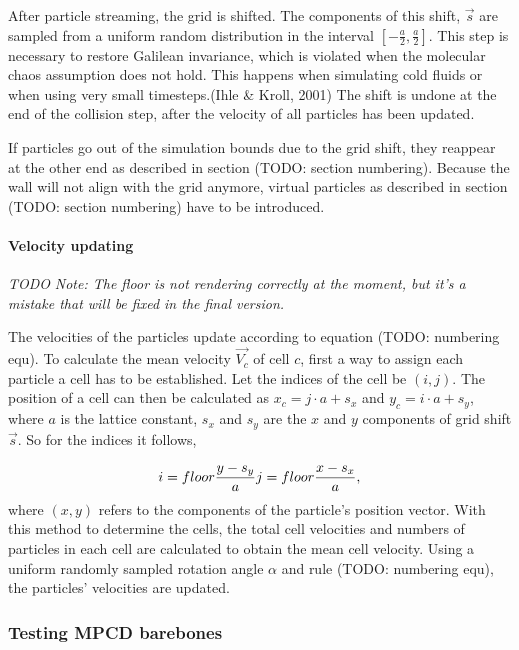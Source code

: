 \documentclass[
]{article}
\begin{document}
After particle streaming, the grid is shifted. The components of this
shift, \(\vec{s}\) are sampled from a uniform random distribution in the
interval \([-\frac{a}{2},\frac{a}{2}]\). This step is necessary to
restore Galilean invariance, which is violated when the molecular chaos
assumption does not hold. This happens when simulating cold fluids or
when using very small timesteps.(Ihle \& Kroll, 2001) The shift is
undone at the end of the collision step, after the velocity of all
particles has been updated.

If particles go out of the simulation bounds due to the grid shift, they
reappear at the other end as described in section (TODO: section
numbering). Because the wall will not align with the grid anymore,
virtual particles as described in section (TODO: section numbering) have
to be introduced.

\hypertarget{velocity-updating}{%
\paragraph{Velocity updating}\label{velocity-updating}}

\emph{TODO} \emph{Note: The floor is not rendering correctly at the
moment, but it's a mistake that will be fixed in the final version.}

The velocities of the particles update according to equation (TODO:
numbering equ). To calculate the mean velocity \(\vec{V_{c}}\) of cell
\(c\), first a way to assign each particle a cell has to be established.
Let the indices of the cell be \((i, j)\). The position of a cell can
then be calculated as \(x_c = j \cdot a + s_x\) and
\(y_c = i \cdot a + s_y\), where \(a\) is the lattice constant, \(s_x\)
and \(s_y\) are the \(x\) and \(y\) components of grid shift
\(\vec{s}\). So for the indices it follows,

\begin{equation}
i = floor{\frac{y - s_y}{a}}\\
j = floor{\frac{x - s_x}{a}},
\end{equation} where \((x,y)\) refers to the components of the
particle's position vector. With this method to determine the cells, the
total cell velocities and numbers of particles in each cell are
calculated to obtain the mean cell velocity. Using a uniform randomly
sampled rotation angle \(\alpha\) and rule (TODO: numbering equ), the
particles' velocities are updated.

\hypertarget{testing-mpcd-barebones}{%
\subsubsection{Testing MPCD barebones}\label{testing-mpcd-barebones}}
\end{document}
